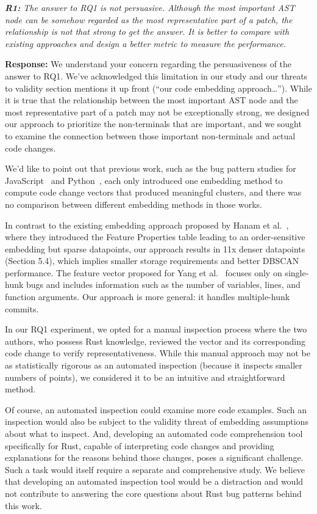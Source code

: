 \documentclass{article}
\begin{document}
\textit{\textbf{R1:} The answer to RQ1 is not persuasive. Although the most important AST node can be somehow regarded as the most representative part of a patch, the relationship is not that strong to get the answer. It is better to compare with existing approaches and design a better metric to measure the performance.}

\vspace*{1em} \noindent \textbf{Response:} We understand your concern regarding the persuasiveness of the answer to RQ1. We've acknowledged this limitation in our study and our threats to validity section mentions it up front (``our code embedding approach\ldots''). While it is true that the relationship between the most important AST node and the most representative part of a patch may not be exceptionally strong, we designed our approach to prioritize the non-terminals that are important, and we sought to examine the connection between those important non-terminals and actual code changes.

We'd like to point out that previous work, such as the bug pattern studies for JavaScript~\cite{hanam2016discovering} and Python~\cite{yang2022mining}, each only introduced one embedding method to compute code change vectors that produced meaningful clusters, and there was no comparison between different embedding methods in those works.

In contrast to the existing embedding approach proposed by Hanam et al.~\cite{hanam2016discovering}, where they introduced the Feature Properties table leading to an order-sensitive embedding but sparse datapoints, our approach results in 11x denser datapoints (Section 5.4), which implies smaller storage requirements and better DBSCAN performance. The feature vector proposed for Yang et al.~\cite{yang2022mining} focuses only on single-hunk bugs and includes information such as the number of variables, lines, and function arguments. Our approach is more general: it handles multiple-hunk commits.

In our RQ1 experiment, we opted for a manual inspection process where the two authors, who possess Rust knowledge, reviewed the vector and its corresponding code change to verify representativeness. While this manual approach may not be as statistically rigorous as an automated inspection (because it inspects smaller numbers of points), we considered it to be an intuitive and straightforward method.

Of course, an automated inspection could examine more code examples. Such an inspection would also be subject to the validity threat of embedding assumptions about what to inspect. And, developing an automated code comprehension tool specifically for Rust, capable of interpreting code changes and providing explanations for the reasons behind those changes, poses a significant challenge. Such a task would itself require a separate and comprehensive study. We believe that developing an automated inspection tool would be a distraction and would not contribute to answering the core questions about Rust bug patterns behind this work.
\end{document}
